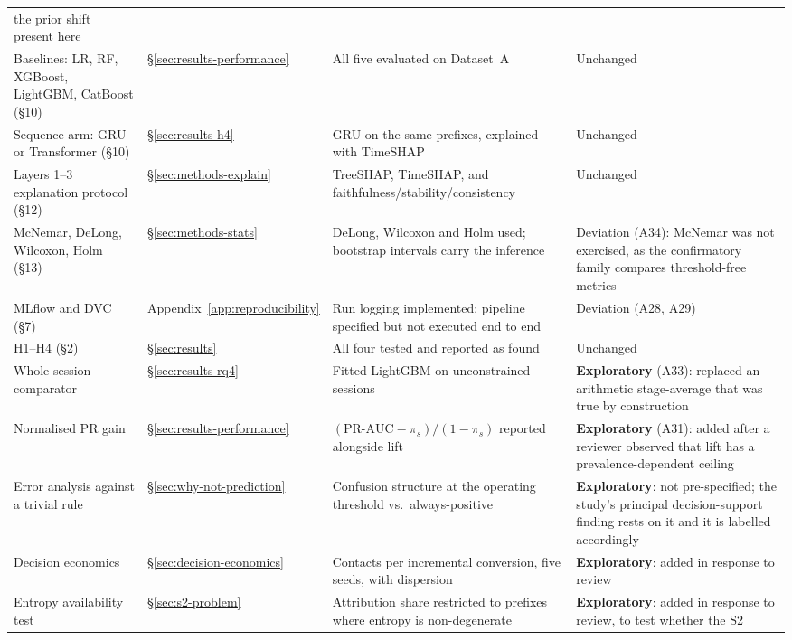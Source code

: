 \documentclass[a4paper]{article}
\begin{document}
\begin{table}[htbp]
\begin{tabular}{@{}p{3.0cm}p{2.5cm}p{5.4cm}p{3.4cm}@{}}
the prior shift present here \\
\addlinespace
Baselines: LR, RF, XGBoost, LightGBM, CatBoost (\S10) &
\S\ref{sec:results-performance} & All five evaluated on Dataset~A &
Unchanged \\
\addlinespace
Sequence arm: GRU or Transformer (\S10) & \S\ref{sec:results-h4} &
GRU on the same prefixes, explained with TimeSHAP & Unchanged \\
\addlinespace
Layers 1--3 explanation protocol (\S12) & \S\ref{sec:methods-explain} &
TreeSHAP, TimeSHAP, and faithfulness/stability/consistency & Unchanged \\
\addlinespace
McNemar, DeLong, Wilcoxon, Holm (\S13) & \S\ref{sec:methods-stats} &
DeLong, Wilcoxon and Holm used; bootstrap intervals carry the inference &
Deviation (A34): McNemar was not exercised, as the confirmatory family
compares threshold-free metrics \\
\addlinespace
MLflow and DVC (\S7) & Appendix~\ref{app:reproducibility} &
Run logging implemented; pipeline specified but not executed end to end &
Deviation (A28, A29) \\
\addlinespace
H1--H4 (\S2) & \S\ref{sec:results} &
All four tested and reported as found & Unchanged \\
\midrule
Whole-session comparator & \S\ref{sec:results-rq4} &
Fitted LightGBM on unconstrained sessions & \textbf{Exploratory} (A33):
replaced an arithmetic stage-average that was true by construction \\
\addlinespace
Normalised PR gain & \S\ref{sec:results-performance} &
$(\text{PR-AUC}-\pi_s)/(1-\pi_s)$ reported alongside lift &
\textbf{Exploratory} (A31): added after a reviewer observed that lift has a
prevalence-dependent ceiling \\
\addlinespace
Error analysis against a trivial rule & \S\ref{sec:why-not-prediction} &
Confusion structure at the operating threshold vs.\ always-positive &
\textbf{Exploratory}: not pre-specified; the study's principal
decision-support finding rests on it and it is labelled accordingly \\
\addlinespace
Decision economics & \S\ref{sec:decision-economics} &
Contacts per incremental conversion, five seeds, with dispersion &
\textbf{Exploratory}: added in response to review \\
\addlinespace
Entropy availability test & \S\ref{sec:s2-problem} &
Attribution share restricted to prefixes where entropy is non-degenerate &
\textbf{Exploratory}: added in response to review, to test whether the S2

\end{tabular}
\end{table}
\end{document}
